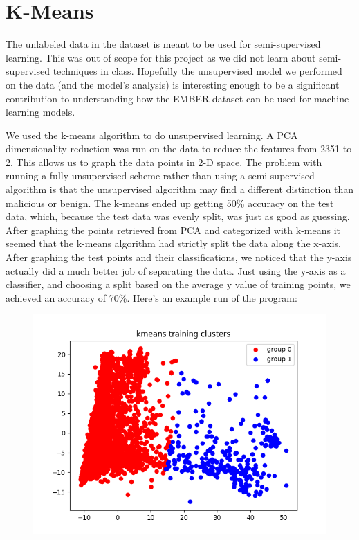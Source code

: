\documentclass[12pt]{article}
\begin{document}
\section{K-Means}
\par
The unlabeled data in the dataset is meant to be used for semi-supervised learning.
This was out of scope for this project as we did not learn about semi-supervised techniques in class.
Hopefully the unsupervised model we performed on the data (and the model's analysis) is interesting enough to be a significant contribution to understanding how the EMBER dataset can be used for machine learning models.
\par
We used the k-means algorithm to do unsupervised learning. A PCA dimensionality reduction was run on the data to reduce the features from 2351 to 2. This allows us to graph the data points in 2-D space.
The problem with running a fully unsupervised scheme rather than using a semi-supervised algorithm is that the unsupervised algorithm may find a different distinction than malicious or benign.
The k-means ended up getting 50\% accuracy on the test data, which, because the test data was evenly split, was just as good as guessing.
After graphing the points retrieved from PCA and categorized with k-means it seemed that the k-means algorithm had strictly split the data along the x-axis.
After graphing the test points and their classifications, we noticed that the y-axis actually did a much better job of separating the data.
Just using the y-axis as a classifier, and choosing a split based on the average y value of training points, we achieved an accuracy of 70\%.
Here's an example run of the program:

\begin{figure}[H]
\centering
\includegraphics[width=.5\textheight]{kmeans_clusters}
\end{figure}
\end{document}
